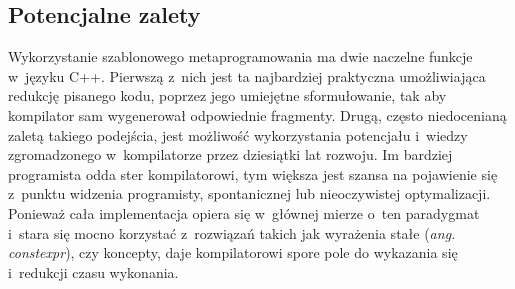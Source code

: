 \documentclass[12pt]{article}
\newcommand{\nonpl}[1]{{\it #1}}
\newcommand{\ang}[1]{\nonpl{ang. #1}}
\begin{document}
{		{
			\subsection{Potencjalne zalety}

			Wykorzystanie szablonowego metaprogramowania\cite{wiki_meta} ma dwie naczelne funkcje w~języku C++. Pierwszą z~nich jest
			ta najbardziej praktyczna umożliwiająca redukcję pisanego kodu, poprzez jego umiejętne sformułowanie, tak aby kompilator
			sam wygenerował odpowiednie fragmenty. Drugą, często niedocenianą zaletą takiego podejścia, jest możliwość wykorzystania
			potencjału i~wiedzy zgromadzonego w~kompilatorze przez dziesiątki lat rozwoju. Im bardziej programista odda ster
			kompilatorowi, tym większa jest szansa na pojawienie się z~punktu widzenia programisty, spontanicznej lub nieoczywistej
			optymalizacji. Ponieważ cała implementacja opiera się w~głównej mierze o~ten paradygmat i~stara się mocno korzystać
			z~rozwiązań takich jak wyrażenia stałe (\ang{constexpr}), czy koncepty, daje kompilatorowi spore pole do wykazania się
			i~redukcji czasu wykonania.
		}
	}
\end{document}
